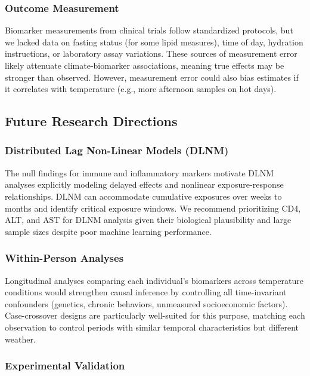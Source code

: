 \subsubsection{Outcome Measurement}

Biomarker measurements from clinical trials follow standardized protocols, but we lacked data on fasting status (for some lipid measures), time of day, hydration instructions, or laboratory assay variations. These sources of measurement error likely attenuate climate-biomarker associations, meaning true effects may be stronger than observed. However, measurement error could also bias estimates if it correlates with temperature (e.g., more afternoon samples on hot days).

\subsection{Future Research Directions}

\subsubsection{Distributed Lag Non-Linear Models (DLNM)}

The null findings for immune and inflammatory markers motivate DLNM analyses explicitly modeling delayed effects and nonlinear exposure-response relationships. DLNM can accommodate cumulative exposures over weeks to months and identify critical exposure windows. We recommend prioritizing CD4, ALT, and AST for DLNM analysis given their biological plausibility and large sample sizes despite poor machine learning performance.

\subsubsection{Within-Person Analyses}

Longitudinal analyses comparing each individual's biomarkers across temperature conditions would strengthen causal inference by controlling all time-invariant confounders (genetics, chronic behaviors, unmeasured socioeconomic factors). Case-crossover designs are particularly well-suited for this purpose, matching each observation to control periods with similar temporal characteristics but different weather.

\subsubsection{Experimental Validation}

